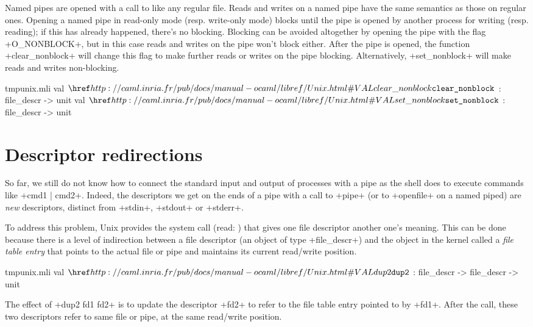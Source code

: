 Named pipes are opened with a call to  like any
regular file. Reads and writes on a named pipe have the same semantics
as those on regular ones. Opening a named pipe in read-only mode
(resp. write-only mode) blocks until the pipe is opened by another
process for writing (resp. reading); if this has already happened,
there's no blocking. Blocking can be avoided altogether by opening the
pipe with the flag \ml+O_NONBLOCK+, but in this case reads and writes
on the pipe won't block either. After the
pipe is opened, the function \ml+clear_nonblock+ will change this flag to make further
reads or writes on the pipe blocking. Alternatively,
\ml+set_nonblock+ will make reads and writes non-blocking.
%
\begin{listingcodefile}{tmpunix.mli}
val $\indexlibvalue{Unix}{clear\_nonblock}$ : file_descr -> unit
val $\indexlibvalue{Unix}{set\_nonblock}$ : file_descr -> unit
\end{listingcodefile}

\section{Descriptor redirections}

So far, we still do not know how to connect the standard input and
output of processes with a pipe as the shell does to execute
commands like \ml+cmd1 | cmd2+. Indeed, the descriptors we get on the
ends of a pipe with a call to \ml+pipe+ (or to \ml+openfile+ on a
named piped) are \emph{new} descriptors, distinct from \ml+stdin+,
\ml+stdout+ or \ml+stderr+.

To address this problem, Unix provides the system call 
(read: ) that gives one file descriptor another one's meaning.
This
can be done because there is a level of indirection between a file
descriptor (an object of type \ml+file_descr+) and the object in the
kernel called a \emph{file table entry} that points to the actual
file or pipe and maintains its current read/write position.
%
\begin{listingcodefile}{tmpunix.mli}
val $\libvalue{Unix}{dup2}$ : file_descr -> file_descr -> unit
\end{listingcodefile}
%
The effect of \ml+dup2 fd1 fd2+ is to update the descriptor \ml+fd2+ to refer to
the file table entry pointed to by \ml+fd1+. After the call, these two
descriptors refer to same file or pipe, at the same read/write
position.

